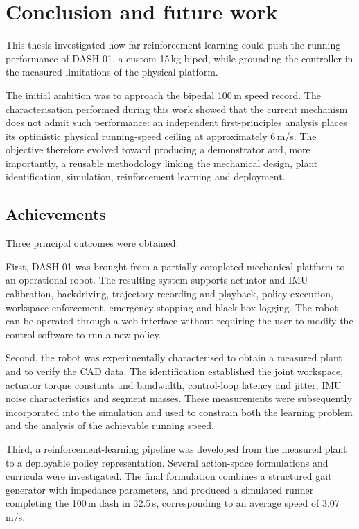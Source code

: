 \section{Conclusion and future work}
\label{sec:conclusion}


This thesis investigated how far reinforcement learning could push the running performance of DASH-01, a custom 15\,kg biped, while grounding the controller in the measured limitations of the physical platform.

The initial ambition was to approach the bipedal 100\,m speed record.
The characterisation performed during this work showed that the current mechanism does not admit such performance: an independent first-principles analysis places its optimistic physical running-speed ceiling at approximately 6\,m/s.
The objective therefore evolved toward producing a demonstrator and, more importantly, a reusable methodology linking the mechanical design, plant identification, simulation, reinforcement learning and deployment.

\subsection{Achievements}

Three principal outcomes were obtained.

First, DASH-01 was brought from a partially completed mechanical platform to an operational robot.
The resulting system supports actuator and IMU calibration, backdriving, trajectory recording and playback, policy execution, workspace enforcement, emergency stopping and black-box logging.
The robot can be operated through a web interface without requiring the user to modify the control software to run a new policy.

Second, the robot was experimentally characterised to obtain a measured plant and to verify the CAD data.
The identification established the joint workspace, actuator torque constants and bandwidth, control-loop latency and jitter, IMU noise characteristics and segment masses.
These measurements were subsequently incorporated into the simulation and used to constrain both the learning problem and the analysis of the achievable running speed.

Third, a reinforcement-learning pipeline was developed from the measured plant to a deployable policy representation.
Several action-space formulations and curricula were investigated.
The final formulation combines a structured gait generator with impedance parameters, and produced a simulated runner completing the 100\,m dash in 32.5\,s, corresponding to an average speed of 3.07\,m/s.

